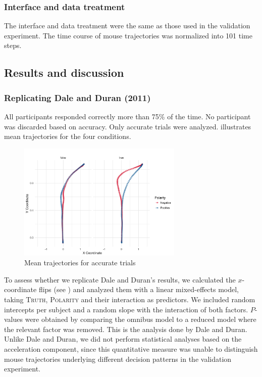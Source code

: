 \documentclass[11pt]{article}
\begin{document}
\subsubsection{Interface and data treatment}
The interface and data treatment were the same as those used in the validation experiment. The time course of mouse trajectories was normalized into 101 time steps.

\subsection{Results and discussion}
\subsubsection{Replicating Dale and Duran (2011)}
All participants responded correctly more than 75\% of the time. No participant was discarded based on accuracy. Only accurate trials were analyzed.  illustrates mean trajectories for the four conditions.
\begin{figure}
\centering
\includegraphics[width=0.7\textwidth]{negation-data-mean-trajectory.png}
\caption{Mean trajectories for accurate trials} \label{fig:mean.trajectory-negation}
\end{figure}

To assess whether we replicate Dale and Duran's results, we calculated the $x$-coordinate flips (see ) and analyzed them with a linear mixed-effects model, taking \textsc{Truth}, \textsc{Polarity} and their interaction as predictors. We included random intercepts per subject and a random slope with the interaction of both factors. $P$-values were obtained by comparing the omnibus model to a reduced model where the relevant factor was removed. This is the analysis done by Dale and Duran. 
Unlike Dale and Duran, we did not perform statistical analyses based on the acceleration component, since this quantitative measure was unable to distinguish mouse trajectories underlying different decision patterns in the validation experiment.
\end{document}
